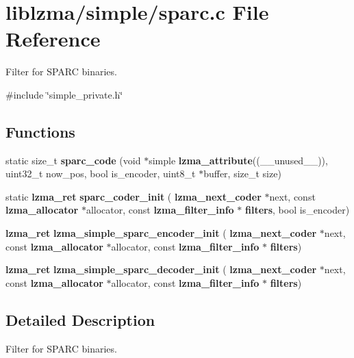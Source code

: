 \section{liblzma/simple/sparc.c File Reference}
\label{sparc_8c}


Filter for S\+P\+A\+RC binaries.  


{\ttfamily \#include \char`\"{}simple\+\_\+private.\+h\char`\"{}}\newline
\subsection*{Functions}
\begin{DoxyCompactItemize}
\item 
\mbox{\label{sparc_8c_afee3cde2f29f3dd06ea2d188607b773a}} 
static size\+\_\+t {\bfseries sparc\+\_\+code} (void $\ast$simple \textbf{ lzma\+\_\+attribute}((\+\_\+\+\_\+unused\+\_\+\+\_\+)), uint32\+\_\+t now\+\_\+pos, bool is\+\_\+encoder, uint8\+\_\+t $\ast$buffer, size\+\_\+t size)
\item 
\mbox{\label{sparc_8c_a7ed4462b5a9ec1dda2c0b1b5c8c99591}} 
static \textbf{ lzma\+\_\+ret} {\bfseries sparc\+\_\+coder\+\_\+init} (\textbf{ lzma\+\_\+next\+\_\+coder} $\ast$next, const \textbf{ lzma\+\_\+allocator} $\ast$allocator, const \textbf{ lzma\+\_\+filter\+\_\+info} $\ast$\textbf{ filters}, bool is\+\_\+encoder)
\item 
\mbox{\label{sparc_8c_a1bcac253d52df521955295ba2b9738a6}} 
\textbf{ lzma\+\_\+ret} {\bfseries lzma\+\_\+simple\+\_\+sparc\+\_\+encoder\+\_\+init} (\textbf{ lzma\+\_\+next\+\_\+coder} $\ast$next, const \textbf{ lzma\+\_\+allocator} $\ast$allocator, const \textbf{ lzma\+\_\+filter\+\_\+info} $\ast$\textbf{ filters})
\item 
\mbox{\label{sparc_8c_af4d53e9f1a3120498b661e0c31c56bab}} 
\textbf{ lzma\+\_\+ret} {\bfseries lzma\+\_\+simple\+\_\+sparc\+\_\+decoder\+\_\+init} (\textbf{ lzma\+\_\+next\+\_\+coder} $\ast$next, const \textbf{ lzma\+\_\+allocator} $\ast$allocator, const \textbf{ lzma\+\_\+filter\+\_\+info} $\ast$\textbf{ filters})
\end{DoxyCompactItemize}


\subsection{Detailed Description}
Filter for S\+P\+A\+RC binaries. 

